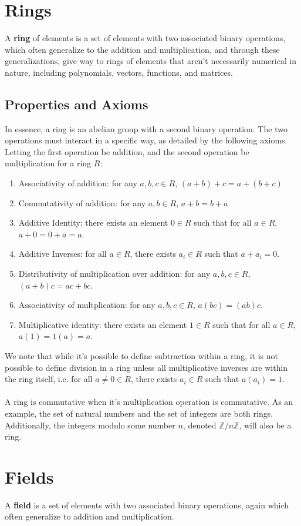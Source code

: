 \documentclass[11pt]{report}
\newcommand{\Z}{\mathbb{Z}}
\begin{document}
\section{Rings}
A \textbf{ring} of elements is a set of elements with two associated binary operations, which often generalize to the addition and multiplication, and through these generalizations, give way to rings of elements that aren't necessarily numerical in nature, including polynomials, vectors, functions, and matrices.
\subsection{Properties and Axioms}
In essence, a ring is an abelian group with a second binary operation. The two operations must interact in a specific way, as detailed by the following axioms. Letting the first operation be addition, and the second operation be multiplication for a ring $R$:
\begin{enumerate}
\item Associativity of addition: for any $a,b,c \in R$, $(a+b)+c = a+(b+c)$
\item Commutativity of addition: for any $a,b \in R$, $a+b = b+a$
\item Additive Identity: there exists an element $0 \in R$ such that for all $a \in R$, $a + 0 = 0 + a = a$.
\item Additive Inverses: for all $a \in R$, there exists $a_i \in R$ such that $a + a_i = 0$.
\item Distributivity of multiplication over addition: for any $a,b,c \in R$, $(a+b)c = ac + bc$.
\item Associativity of multplication: for any $a,b,c \in R$, $a(bc)=(ab)c$.
\item Multiplicative identity: there exists an element $1 \in R$ such that for all $a \in R$, $a(1) = 1(a) = a$.
\end{enumerate}
We note that while it's possible to define subtraction within a ring, it is not possible to define division in a ring unless all multiplicative inverses are within the ring itself, i.e. for all $a \ne 0 \in R$, there exists $a_i \in R$ such that $a(a_i) = 1$.
\\ \\
A ring is commutative when it's multiplication operation is commutative. As an example, the set of natural numbers and the set of integers are both rings. Additionally, the integers modulo some number $n$, denoted $\Z/n\Z$, will also be a ring.
\section{Fields}
A \textbf{field} is a set of elements with two associated binary operations, again which often generalize to addition and multiplication.
\end{document}
